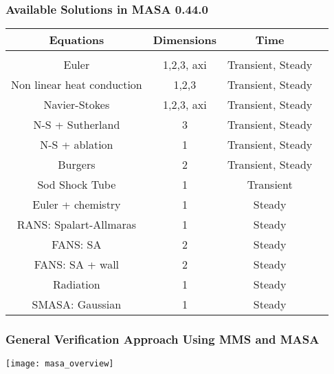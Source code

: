 \documentclass[mathserif]{beamer}
\begin{document}
\begin{frame}
  \frametitle{Available Solutions in MASA 0.44.0}

  \begin{table}
    \centering
    \begin{tabular}{c c c c}
      \hline
      Equations & Dimensions & Time \\
      \hline \vspace{-8pt} \\
      Euler                      & 1,2,3, axi & Transient, Steady \\
      Non linear heat conduction & 1,2,3 & Transient, Steady \\
      Navier-Stokes              & 1,2,3, axi & Transient, Steady \\
      N-S + Sutherland           &     3 & Transient, Steady \\
      N-S + ablation             &     1 & Transient, Steady \\
      Burgers                    &     2 & Transient, Steady \\ 
      Sod Shock Tube             &     1 & Transient \\
      Euler + chemistry          &     1 & Steady    \\
      RANS: Spalart-Allmaras     &     1 & Steady \\
      FANS: SA                   &     2 & Steady \\
      FANS: SA + wall            &     2 & Steady \\
      Radiation                  &     1 & Steady \\ 
      SMASA: Gaussian            &     1 & Steady \\ 
      \hline
    \end{tabular}
  \end{table}
\end{frame}


\begin{frame}
  \frametitle{General Verification Approach Using MMS and MASA}
  \begin{center}
    \texttt{[image: masa\_overview]} \\
  \end{center}
\end{frame}
\end{document}
